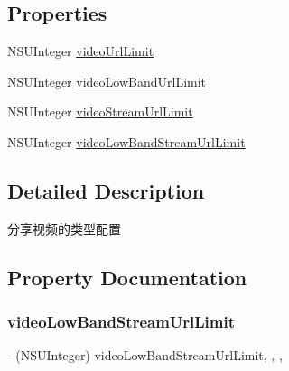 \subsection*{Properties}
\begin{DoxyCompactItemize}
\item 
N\+S\+U\+Integer \mbox{\hyperlink{interface_u_m_social_share_video_object_config_a4a1b426bb757575cb72d0e0369bae9cf}{video\+Url\+Limit}}
\item 
N\+S\+U\+Integer \mbox{\hyperlink{interface_u_m_social_share_video_object_config_aaf10dc3787464279a5dc6491be6c2cff}{video\+Low\+Band\+Url\+Limit}}
\item 
N\+S\+U\+Integer \mbox{\hyperlink{interface_u_m_social_share_video_object_config_ad42e1bd31a005bf6886a36cd2d23a6ba}{video\+Stream\+Url\+Limit}}
\item 
N\+S\+U\+Integer \mbox{\hyperlink{interface_u_m_social_share_video_object_config_a90fccae97727e8246b9ae5279028e01b}{video\+Low\+Band\+Stream\+Url\+Limit}}
\end{DoxyCompactItemize}


\subsection{Detailed Description}
分享视频的类型配置 

\subsection{Property Documentation}
\mbox{\label{interface_u_m_social_share_video_object_config_a90fccae97727e8246b9ae5279028e01b}} 
\subsubsection{\texorpdfstring{video\+Low\+Band\+Stream\+Url\+Limit}{videoLowBandStreamUrlLimit}}
{\footnotesize\ttfamily -\/ (N\+S\+U\+Integer) video\+Low\+Band\+Stream\+Url\+Limit\hspace{0.3cm}{\ttfamily [read]}, {\ttfamily [write]}, {\ttfamily [nonatomic]}, {\ttfamily [assign]}}

